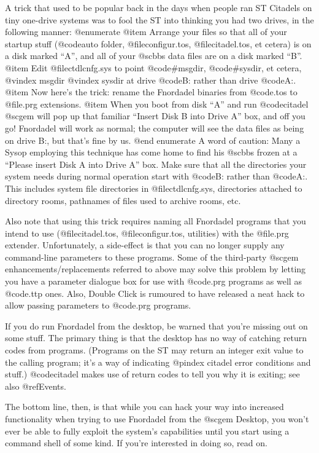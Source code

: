 A trick that used to be popular back in the days when people ran
ST Citadels on tiny one-drive systems was to fool the ST into thinking
you had two drives, in the following manner:
@enumerate
@item
Arrange your files so that all of your startup
stuff (@code{auto} folder, @file{configur.tos}, @file{citadel.tos}, et cetera)
is on a disk marked ``A'',
and all of your @sc{bbs} data files are on a disk marked ``B''.
@item
Edit
@file{ctdlcnfg.sys} to point @code{#msgdir}, @code{#sysdir}, et cetera,
@vindex msgdir
@vindex sysdir
at drive @code{B:} rather than
drive @code{A:}.
@item
Now here's the trick: rename the Fnordadel binaries from @code{.tos} to
@file{.prg} extensions.
@item
When you boot from disk ``A'' and run @code{citadel}
@sc{gem} will
pop up that familiar ``Insert Disk B into Drive A'' box, and off you go!
Fnordadel will work as normal; the computer will see the data files as
being on drive B:, but that's fine by us.
@end enumerate
A word of caution:  Many a
Sysop employing this technique has come home to find his @sc{bbs} frozen at a
``Please insert Disk A into Drive A'' box.  Make sure that all the directories
your system needs during normal operation start with @code{B:\@dots{}}
rather than
@code{A:\@dots{}}.  This includes system file directories in
@file{ctdlcnfg.sys}, directories
attached to directory rooms, pathnames of files used to archive rooms, etc.

Also note that using this trick requires naming all Fnordadel
programs that you intend to use (@file{citadel.tos}, @file{configur.tos},
utilities) with
the @file{.prg} extender.  Unfortunately,
a side-effect is that you can no longer
supply any command-line parameters to these programs.  Some of the
third-party @sc{gem} enhancements/replacements referred to above may solve
this problem
by letting you have a parameter dialogue box for use with @code{.prg} programs
as well as @code{.ttp} ones.  Also, Double Click is rumoured to have
released a neat hack to allow passing parameters to @code{.prg} programs.

If you do run Fnordadel from the desktop, be warned that you're
missing out on some stuff.  The primary thing is that the desktop has no
way of catching return codes from programs.  (Programs on the ST may return
an integer exit value to the calling program; it's a way of indicating
@pindex citadel
error conditions and stuff.)  @code{citadel} makes use of return codes to tell
you why it is exiting; see also @ref{Events}.

The bottom line, then, is that while you can hack your way into
increased functionality when trying to use Fnordadel from the @sc{gem} Desktop,
you won't ever be able to fully exploit the system's capabilities until you
start using a command shell of some kind.  If you're interested in doing so,
read on.

